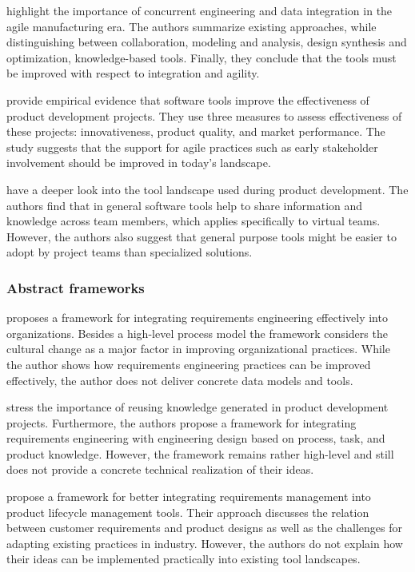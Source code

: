 \cite{buyukozkan2004survey} highlight the importance of concurrent engineering and data integration in the agile manufacturing era.
The authors summarize existing approaches, while distinguishing between collaboration, modeling and analysis, design synthesis and optimization, knowledge-based tools.
Finally, they conclude that the tools must be improved with respect to integration and agility.

\cite{DURMUSOGLU2011321} provide empirical evidence that software tools improve the effectiveness of product development projects.
They use three measures to assess effectiveness of these projects: innovativeness, product quality, and market performance.
The study suggests that the support for agile practices such as early stakeholder involvement should be improved in today's landscape.

\cite{marion_fixson_2019} have a deeper look into the tool landscape used during product development.
The authors find that in general software tools help to share information and knowledge across team members, which applies specifically to virtual teams.
However, the authors also suggest that general purpose tools might be easier to adopt by project teams than specialized solutions.

\subsubsection{Abstract frameworks}
\label{sec:differentiation:academic:abstract}

\cite{Kauppinen2005} proposes a framework for integrating requirements engineering effectively into organizations.
Besides a high-level process model the framework considers the cultural change as a major factor in improving organizational practices.
While the author shows how requirements engineering practices can be improved effectively, the author does not deliver concrete data models and tools.

\cite{BAXTER2008585} stress the importance of reusing knowledge generated in product development projects.
Furthermore, the authors propose a framework for integrating requirements engineering with engineering design based on process, task, and product knowledge.
However, the framework remains rather high-level and still does not provide a concrete technical realization of their ideas.

\cite{Jorma2014} propose a framework for better integrating requirements management into product lifecycle management tools.
Their approach discusses the relation between customer requirements and product designs as well as the challenges for adapting existing practices in industry.
However, the authors do not explain how their ideas can be implemented practically into existing tool landscapes.

